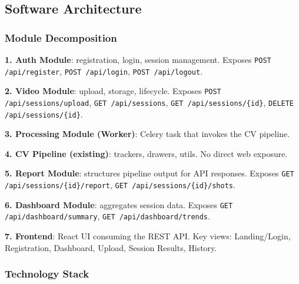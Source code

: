 ﻿\documentclass[11pt,a4paper]{article}
\begin{document}
\subsection{Software Architecture}

\subsubsection{Module Decomposition}

\textbf{1. Auth Module}: registration, login, session management. Exposes \texttt{POST /api/register}, \texttt{POST /api/login}, \texttt{POST /api/logout}.

\textbf{2. Video Module}: upload, storage, lifecycle. Exposes \texttt{POST /api/sessions/upload}, \texttt{GET /api/sessions}, \texttt{GET /api/sessions/\{id\}}, \texttt{DELETE /api/sessions/\{id\}}.

\textbf{3. Processing Module (Worker)}: Celery task that invokes the CV pipeline.

\textbf{4. CV Pipeline (existing)}: trackers, drawers, utils. No direct web exposure.

\textbf{5. Report Module}: structures pipeline output for API responses. Exposes \texttt{GET /api/sessions/\{id\}/report}, \texttt{GET /api/sessions/\{id\}/shots}.

\textbf{6. Dashboard Module}: aggregates session data. Exposes \texttt{GET /api/dashboard/summary}, \texttt{GET /api/dashboard/trends}.

\textbf{7. Frontend}: React UI consuming the REST API. Key views: Landing/Login, Registration, Dashboard, Upload, Session Results, History.

\subsubsection{Technology Stack}
\end{document}
